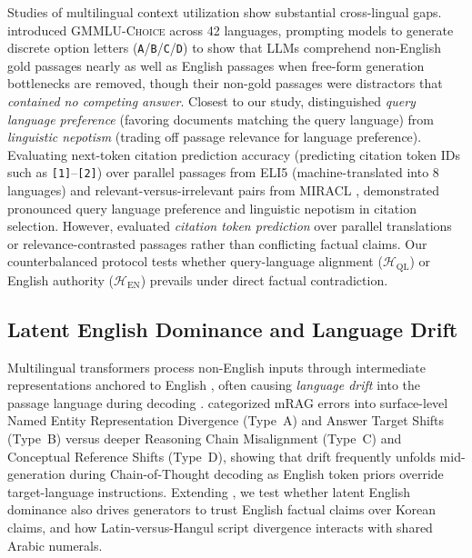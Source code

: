 Studies of multilingual context utilization \citep{chirkova2024retrieval,wu2024not,liu2025xrag} show substantial cross-lingual gaps. \citet{qi2025consistency} introduced \textsc{GMMLU-Choice} across 42 languages, prompting models to generate discrete option letters (\texttt{A}/\texttt{B}/\texttt{C}/\texttt{D}) to show that LLMs comprehend non-English gold passages nearly as well as English passages when free-form generation bottlenecks are removed, though their non-gold passages were distractors that \emph{contained no competing answer}. Closest to our study, \citet{ki2025linguistic} distinguished \emph{query language preference} (favoring documents matching the query language) from \emph{linguistic nepotism} (trading off passage relevance for language preference). Evaluating next-token citation prediction accuracy (predicting citation token IDs such as \texttt{[1]}--\texttt{[2]}) over parallel passages from ELI5 (machine-translated into 8 languages) and relevant-versus-irrelevant pairs from MIRACL \citep{zhang2023miracl}, \citet{ki2025linguistic} demonstrated pronounced query language preference and linguistic nepotism in citation selection. However, \citet{ki2025linguistic} evaluated \emph{citation token prediction} over parallel translations or relevance-contrasted passages rather than conflicting factual claims. Our counterbalanced protocol tests whether query-language alignment ($\mathcal{H}_{\text{QL}}$) or English authority ($\mathcal{H}_{\text{EN}}$) prevails under direct factual contradiction.

\subsection{Latent English Dominance and Language Drift}
\label{subsec:rw_drift}

Multilingual transformers process non-English inputs through intermediate representations anchored to English \citep{wendler2024llamas}, often causing \emph{language drift} into the passage language during decoding \citep{chirkova2024retrieval,park2025investigating,li2025language}. \citet{li2025language} categorized mRAG errors into surface-level Named Entity Representation Divergence (Type~A) and Answer Target Shifts (Type~B) versus deeper Reasoning Chain Misalignment (Type~C) and Conceptual Reference Shifts (Type~D), showing that drift frequently unfolds mid-generation during Chain-of-Thought decoding as English token priors override target-language instructions. Extending \citet{li2025language}, we test whether latent English dominance also drives generators to trust English factual claims over Korean claims, and how Latin-versus-Hangul script divergence interacts with shared Arabic numerals.

